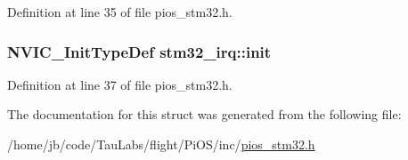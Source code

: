\-Definition at line 35 of file pios\-\_\-stm32.\-h.

\hypertarget{structstm32__irq_aef3e74e894b4025023b6be1ab8b4348f}{
\subsubsection[{init}]{\setlength{\rightskip}{0pt plus 5cm}\-N\-V\-I\-C\-\_\-\-Init\-Type\-Def {\bf stm32\-\_\-irq\-::init}}}\label{structstm32__irq_aef3e74e894b4025023b6be1ab8b4348f}


\-Definition at line 37 of file pios\-\_\-stm32.\-h.



\-The documentation for this struct was generated from the following file\-:\begin{DoxyCompactItemize}
\item 
/home/jb/code/\-Tau\-Labs/flight/\-Pi\-O\-S/inc/\hyperlink{pios__stm32_8h}{pios\-\_\-stm32.\-h}\end{DoxyCompactItemize}
